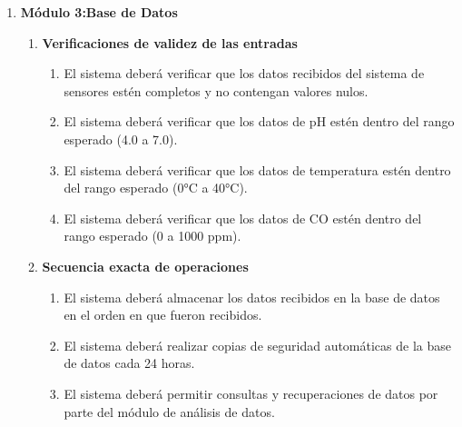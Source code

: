 \begin{enumerate}
\begin{enumerate}
            \item \textbf{Efecto de los parámetros}
                \begin{enumerate}
                    \item El sistema deberá ajustar la frecuencia del análisis de datos si se detectan cambios significativos en los parámetros monitoreados.
                    \item El sistema deberá priorizar el análisis de datos si se detectan valores críticos en cualquiera de los parámetros.
                \end{enumerate}   
        
            \item \textbf{Relación entre las salidas y las entradas}
                \begin{enumerate}
                    \item El sistema deberá generar informes detallados basados en los datos analizados, incluyendo gráficos y tendencias.
                    \item El sistema deberá actualizar la base de datos con los resultados del análisis para su posterior consulta.
               \end{enumerate}
        \end{enumerate}
    \item \textbf{Módulo 3:Base de Datos}
        \begin{enumerate}
            \item \textbf{Verificaciones de validez de las entradas}
                \begin{enumerate}
                    \item El sistema deberá verificar que los datos recibidos del sistema de sensores estén completos y no contengan valores nulos.
                    \item El sistema deberá verificar que los datos de pH estén dentro del rango esperado (4.0 a 7.0).
                    \item El sistema deberá verificar que los datos de temperatura estén dentro del rango esperado (0°C a 40°C).
                    \item El sistema deberá verificar que los datos de CO estén dentro del rango esperado (0 a 1000 ppm).
                \end{enumerate}   
            
            \item \textbf{Secuencia exacta de operaciones}
                \begin{enumerate}
                    \item El sistema deberá almacenar los datos recibidos en la base de datos en el orden en que fueron recibidos.
                    \item El sistema deberá realizar copias de seguridad automáticas de la base de datos cada 24 horas.
                    \item El sistema deberá permitir consultas y recuperaciones de datos por parte del módulo de análisis de datos.
                \end{enumerate}   
        

\end{enumerate}
\end{enumerate}
